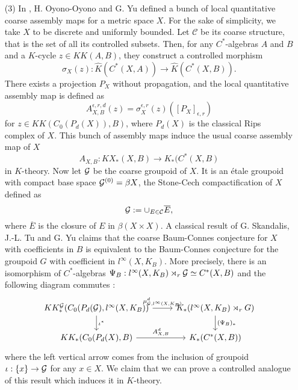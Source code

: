 \begin{itemize}
\item[(3)] In \cite{OY3}, H. Oyono-Oyono and G. Yu defined a bunch of local quantitative coarse assembly maps for a metric space $X$. For the sake of simplicity, we take $X$ to be discrete and uniformly bounded. Let $\mathcal C$ be its coarse structure, that is the set of all its controlled subsets. Then, for any $C^*$-algebras $A$ and $B$ and a $K$-cycle $z\in KK(A,B)$, they construct a controlled morphism
\[\sigma_X(z) : \hat K(C^*(X,A))\rightarrow \hat K(C^*(X,B)).\]
There exists a projection $P_X$ without propagation, and the local quantitative assembly map is defined as 
\[A_{X,B}^{\epsilon,r,d}(z)=\sigma_X^{\epsilon,r}(z)([P_X]_{\epsilon,r})\] for $z\in KK(C_0(P_d(X)),B)$, where $P_d(X)$ is the classical Rips complex of $X$. This bunch of assembly maps induce the usual coarse assembly map of $X$ 
\[A_{X,B} : KX_*(X,B)\rightarrow K_*(C^*(X,B)\]
in $K$-theory. Now let $\mathcal G$ be the coarse groupoid of $X$. It is an étale groupoid with compact base space $\mathcal G^{(0)}=\beta X$, the Stone-Cech compactification of $X$ defined as
\[\mathcal G := \cup_{E \in \mathcal C} \overline E,\] 
where $\overline E$ is the closure of $E$ in $\beta (X \times X)$. 
A classical result of G. Skandalis, J.-L. Tu and G. Yu \cite{SkTuYu} claims that the coarse Baum-Connes conjecture for $X$ with coefficients in $B$ is equivalent to the Baum-Connes conjecture for the groupoid $G$ with coefficient in $l^\infty(X,K_B)$. More precisely, there is an isomorphism of $C^*$-algebras $\Psi_B : l^\infty(X,K_B)\rtimes_r \mathcal G \simeq C^*(X,B)$ and the following diagram commutes :
\[\begin{tikzcd}
KK_*^\G(C_0(P_d(\G),l^\infty(X,K_B)) \arrow{r}{\mu_{\G,l^\infty(X,K_B)}^d}\arrow{d}{\iota^*}& K_*(l^\infty(X, K_B)\rtimes_r G)\arrow{d}{(\Psi_B)_*}\\
KK_*(C_0(P_d(X),B) \arrow{r}{A_{X,B}^d}& K_*(C^*(X,B))
\end{tikzcd}\]
where the left vertical arrow comes from the inclusion of groupoid $\iota :\{x\}\rightarrow \mathcal G$ for any $x\in X$. We claim that we can prove a controlled analogue of this result which induces it in $K$-theory.


\end{itemize}
